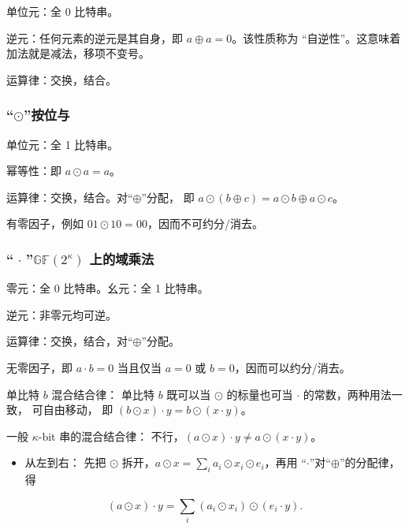 单位元：全 0 比特串。

逆元：任何元素的逆元是其自身，即 $a\oplus a = 0$。该性质称为
“自逆性”。这意味着加法就是减法，移项不变号。

运算律：交换，结合。

\subsubsection{\texorpdfstring{“$\odot$”按位与}{“\textbackslash odot”按位与}}

单位元：全 1 比特串。

幂等性：即 $a\odot a = a$。

运算律：交换，结合。对“$\oplus$”分配，
即 $a \odot (b \oplus c) = a \odot b \oplus a \odot c$。

有零因子，例如 $01 \odot 10 = 00$，因而不可约分/消去。

\subsubsection{\texorpdfstring{“$\,\cdot\,$”$\mathbb{GF}(2^{\kappa})$ 上的域乘法}{“\textbackslash，\textbackslash cdot\textbackslash，”\textbackslash mathbb\{GF\}（2\^{}\{\textbackslash kappa\}）上的域乘法}}

零元：全 0 比特串。幺元：全 1 比特串。

逆元：非零元均可逆。

运算律：交换，结合，对“$\oplus$”分配。

无零因子，即 $a\cdot b = 0$ 当且仅当 $a=0$ 或 $b=0$，因而可以约分/消去。

单比特 $b$ 混合结合律：
单比特 $b$ 既可以当 $\odot$ 的标量也可当 $\cdot$ 的常数，两种用法一致，
可自由移动，
即 $\left(b \odot x\right) \cdot y = b \odot \left(x \cdot y\right)$。

一般 $\kappa$-bit 串的混合结合律：
不行，$(a\odot x) \cdot y \ne a \odot (x\cdot y)$。

\begin{itemize}

\item
  从左到右：
  先把 $\odot$ 拆开，$a \odot x = \sum_i a_i \odot x_i \odot e_i$，再用
“$\cdot$”对“$\oplus$”的分配律，得
\end{itemize}
\begin{equation}\label{eq:02-kos15:22}
\left(a \odot x\right) \cdot y = \sum_i \left(a_i \odot x_i\right) \odot \left(e_i \cdot y\right).
\end{equation}

